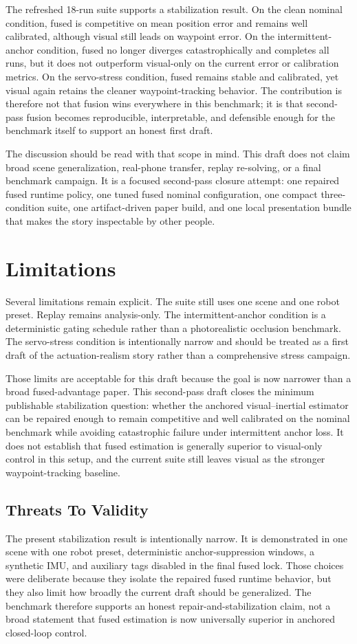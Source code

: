 \documentclass[11pt]{article}
\begin{document}
The refreshed 18-run suite supports a stabilization result. On the clean nominal condition, fused is competitive on mean position error and remains well calibrated, although visual still leads on waypoint error. On the intermittent-anchor condition, fused no longer diverges catastrophically and completes all runs, but it does not outperform visual-only on the current error or calibration metrics. On the servo-stress condition, fused remains stable and calibrated, yet visual again retains the cleaner waypoint-tracking behavior. The contribution is therefore not that fusion wins everywhere in this benchmark; it is that second-pass fusion becomes reproducible, interpretable, and defensible enough for the benchmark itself to support an honest first draft.

The discussion should be read with that scope in mind. This draft does not claim broad scene generalization, real-phone transfer, replay re-solving, or a final benchmark campaign. It is a focused second-pass closure attempt: one repaired fused runtime policy, one tuned fused nominal configuration, one compact three-condition suite, one artifact-driven paper build, and one local presentation bundle that makes the story inspectable by other people.

\section{Limitations}
Several limitations remain explicit. The suite still uses one scene and one robot preset. Replay remains analysis-only. The intermittent-anchor condition is a deterministic gating schedule rather than a photorealistic occlusion benchmark. The servo-stress condition is intentionally narrow and should be treated as a first draft of the actuation-realism story rather than a comprehensive stress campaign.

Those limits are acceptable for this draft because the goal is now narrower than a broad fused-advantage paper. This second-pass draft closes the minimum publishable stabilization question: whether the anchored visual--inertial estimator can be repaired enough to remain competitive and well calibrated on the nominal benchmark while avoiding catastrophic failure under intermittent anchor loss. It does not establish that fused estimation is generally superior to visual-only control in this setup, and the current suite still leaves visual as the stronger waypoint-tracking baseline.

\subsection{Threats To Validity}
The present stabilization result is intentionally narrow. It is demonstrated in one scene with one robot preset, deterministic anchor-suppression windows, a synthetic IMU, and auxiliary tags disabled in the final fused lock. Those choices were deliberate because they isolate the repaired fused runtime behavior, but they also limit how broadly the current draft should be generalized. The benchmark therefore supports an honest repair-and-stabilization claim, not a broad statement that fused estimation is now universally superior in anchored closed-loop control.



\end{document}
